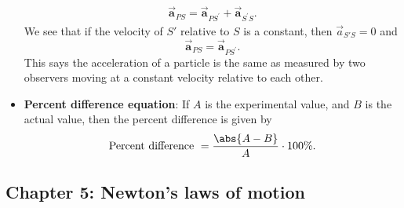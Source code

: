 \documentclass{report}
\begin{document}
\begin{itemize}
            \begin{align*}
                \vec{\mathbf{a}}_{PS} = \vec{\mathbf{a}}_{PS^{\prime}} + \vec{\mathbf{a}}_{S^{\prime}S}
            .\end{align*}
            We see that if the velocity of \(S'\) relative to \(S\) is a constant, then \(\vec{a}_{S'S} = 0\) and
            \[
                \vec{\mathbf{a}}_{PS} = \vec{\mathbf{a}}_{PS^{\prime}}.
            \]
            This says the acceleration of a particle is the same as measured by two observers moving at a constant velocity relative to each other.
        \item \textbf{Percent difference equation}: If $A$ is the experimental value, and $B$ is the actual value, then the percent difference is given by
            \begin{align*}
                \text{Percent difference } = \frac{\abs{A - B}}{A} \cdot 100\%
            .\end{align*}
        \end{itemize}
        \pagebreak 
        \subsection{Chapter 5: Newton's laws of motion}
        \bigbreak \noindent 
\end{document}
